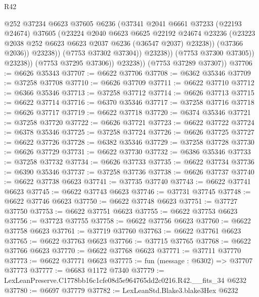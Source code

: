 \begin{lexlean}{R42}
\begin{coremodule}
{                            @252
                            @37234
                            @6623
                            @37605
                            @6236
                            (@37341
                              @2041
                              @6661
                              @37233
                              (@22193 @24674)
                              @37605
                              (@23224
                                @2040
                                @6623
                                @6625
                                @22192
                                @24674
                                @23236
                                (@23223 @2038 @252 @6623 @6623 @2037 @6236 (@36547 @2037) @23238))
                              (@37366 @2036))
                            @23238))
                        (@7753 @37302 @37304))
                      @23238))
                  (@7753 @37300 @37305))
                @23238))
            (@7753 @37295 @37306))
          @23238))
      (@7753 @37289 @37307))
@37706 := @6626 @35343
@37707 := @6622 @37706
@37708 := @6362 @35346
@37709 := @37258 @37708
@37710 := @6626 @37709
@37711 := @6622 @37710
@37712 := @6366 @35346
@37713 := @37258 @37712
@37714 := @6626 @37713
@37715 := @6622 @37714
@37716 := @6370 @35346
@37717 := @37258 @37716
@37718 := @6626 @37717
@37719 := @6622 @37718
@37720 := @6374 @35346
@37721 := @37258 @37720
@37722 := @6626 @37721
@37723 := @6622 @37722
@37724 := @6378 @35346
@37725 := @37258 @37724
@37726 := @6626 @37725
@37727 := @6622 @37726
@37728 := @6382 @35346
@37729 := @37258 @37728
@37730 := @6626 @37729
@37731 := @6622 @37730
@37732 := @6386 @35346
@37733 := @37258 @37732
@37734 := @6626 @37733
@37735 := @6622 @37734
@37736 := @6390 @35346
@37737 := @37258 @37736
@37738 := @6626 @37737
@37740 := @6622 @37738 @6623
@37741 := @37735 @37740
@37743 := @6622 @37741 @6623
@37745 := @6622 @37743 @6623
@37746 := @37731 @37745
@37748 := @6622 @37746 @6623
@37750 := @6622 @37748 @6623
@37751 := @37727 @37750
@37753 := @6622 @37751 @6623
@37755 := @6622 @37753 @6623
@37756 := @37723 @37755
@37758 := @6622 @37756 @6623
@37760 := @6622 @37758 @6623
@37761 := @37719 @37760
@37763 := @6622 @37761 @6623
@37765 := @6622 @37763 @6623
@37766 := @37715 @37765
@37768 := @6622 @37766 @6623
@37770 := @6622 @37768 @6623
@37771 := @37711 @37770
@37773 := @6622 @37771 @6623
@37775 := fun (message : @6302) => @37707 @37773
@37777 := @6683 @1172 @7340
@37779 := LexLeanPreserve.C1778bb16c1cfe08d5e964765dd2c0216.R42.__fits_34 @6232
@37780 := @6697 @37779
@37782 := LexLeanStd.Blake3.blake3Hex @6232
}
\end{coremodule}
\end{lexlean}

